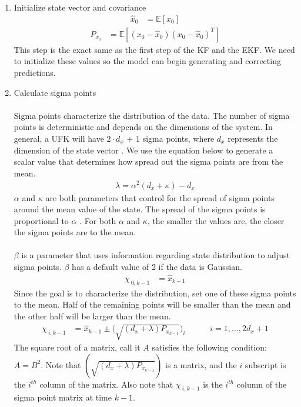 \begin{enumerate}
    \item Initialize state vector and covariance
    \begin{align*}
        \hat{x}_{0} &= \mathbb{E}[x_{0}] 
       \end{align*}
        \begin{align*}
        P_{x_{0}} &= \mathbb{E}[(x_{0}-\hat{x}_{0})(x_{0}-\hat{x}_{0})^{T}] 
    \end{align*}
    This step is the exact same as the first step of the KF and the EKF. We need to initialize these values so the model can begin generating and correcting predictions.
    
        \item Calculate sigma points \\ \\
        Sigma points characterize the distribution of the data. The number of sigma points is deterministic and depends on the dimensions of the system. In general, a UFK will have  $2 \cdot d_x$ + 1 sigma points, where $d_x$ represents the dimension of the state vector \cite{inbook, inproceedings, Wan01theunscented}.  We use the equation below to generate a scalar value that determines how spread out the sigma points are from the mean. 
         \begin{align*}
        \lambda = \alpha^{2}(d_{x}+\kappa)-d_{x} 
         \end{align*}
         $\alpha$ and $\kappa$ are both parameters that control for the spread of sigma points around the mean value of the state. The spread of the sigma points is proportional to $\alpha$ . For both $\alpha$ and $\kappa $,  the smaller the values are, the closer the sigma points are to the mean.\\ \\
       $\beta$ is a parameter that uses information regarding state distribution to adjust sigma points. $\beta$ has a default value of 2 if the data is Gaussian. 
    \begin{align*}
        \chi_{\ 0,k-1} &= \hat{x}_{k-1} 
     \end{align*}
             Since the goal is to characterize the distribution, set one of these sigma points to the mean. Half of the remaining points will be smaller than the mean and the other half will be larger than the mean.
     \begin{align*}
        \chi_{\ i,k-1} &= \hat{x}_{k-1} \pm \bigg(\sqrt{(d_{x}+\lambda )P_{x_{k-1}}}\bigg)_{i} \quad \quad \quad i=1,\dots,2 d_x + 1
        \end{align*}
        The square root of a matrix, call it $A$ satisfies the following condition: $A = B^2$. Note that $(\sqrt{(d_{x}+\lambda)P_{x_{k-1}}})$ is a matrix, and the $i$ subscript is the $i^{th}$ column of the matrix. Also note that $\chi_{\ i,k-1}$ is the $i^{th}$ column of the sigma point matrix at time $k-1$.
       


\end{enumerate}
